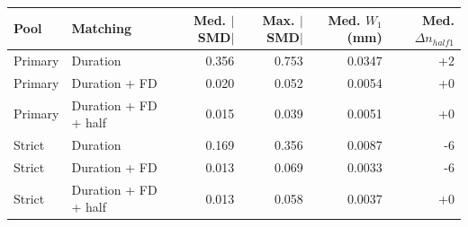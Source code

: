 \begin{tabular}{llrrrr}
\toprule
Pool & Matching & Med. $|$SMD$|$ & Max. $|$SMD$|$ & Med. $W_1$ (mm) & Med. $\Delta n_{half1}$ \\
\midrule
Primary & Duration & 0.356 & 0.753 & 0.0347 & +2 \\
Primary & Duration + FD & 0.020 & 0.052 & 0.0054 & +0 \\
Primary & Duration + FD + half & 0.015 & 0.039 & 0.0051 & +0 \\
Strict & Duration & 0.169 & 0.356 & 0.0087 & -6 \\
Strict & Duration + FD & 0.013 & 0.069 & 0.0033 & -6 \\
Strict & Duration + FD + half & 0.013 & 0.058 & 0.0037 & +0 \\
\bottomrule
\end{tabular}
